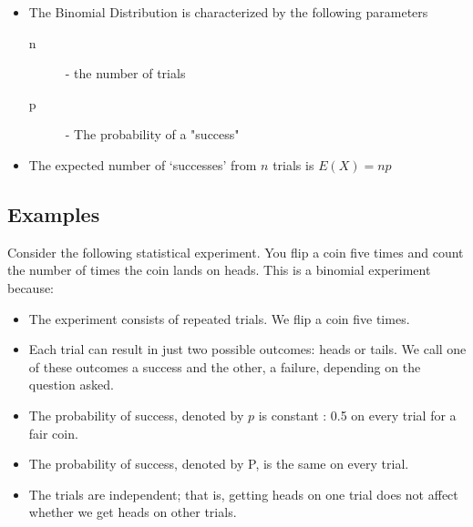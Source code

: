 \documentclass[a4paper,12pt]{article}
\begin{document}
%



%
%
%
%
%













\begin{itemize}
	\item The Binomial Distribution is characterized by the following parameters
	
	
	\begin{description}
		\item[n] - the number of trials
		
		\item[p] - The probability of a "success"
	\end{description}	
	
	\item The expected number of `successes' from $n$ trials is $E(X) = np$


	\end{itemize}
\subsection*{Examples}
Consider the following statistical experiment. You flip a coin five times and count the number of times the coin lands on heads. This is a binomial experiment because:
\begin{itemize}
\item The experiment consists of repeated trials. We flip a coin five times.
\item Each trial can result in just two possible outcomes: heads or tails. We call one of these outcomes a success and the other, a failure, depending on the question asked.

\item The probability of success, denoted by $p$ is constant : 0.5 on every trial for a fair coin.
\item The probability of success, denoted by P, is the same on every trial.
\item The trials are independent; that is, getting heads on one trial does not affect whether we get heads on other trials.
\end{itemize}
\end{document}
